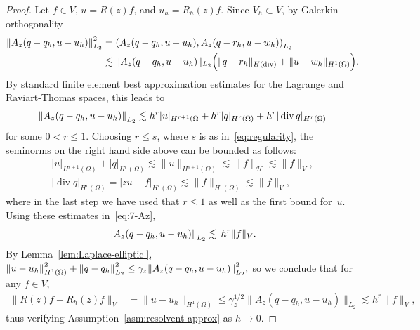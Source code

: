 \documentclass[10pt,a4paper]{amsart}
\DeclareMathOperator{\diver}{div}
\DeclarePairedDelimiter{\norm}{\lVert}{\rVert}
\newcommand{\Af}{{A}}
\newcommand{\Hc}{\mathcal{H}}
\newcommand{\om}{\Omega}
\begin{document}
\begin{proof}
  Let $f \in V$,  $u = R(z) f$,  and $u_h = R_h(z) f$.
  Since $V_h \subset V$, by Galerkin orthogonality
  \begin{align*}
    \norm*{\Af_z (q - q_h, u - u_h)}_{L_2}^2
    & =
      \left(
      \Af_z(q - q_h, u - u_h), \Af_z(q - r_h, u - w_h)
      \right)_{L_2}
    \\
    & \lesssim
      \| \Af_z(q - q_h, u - u_h)\|_{L_2}
      \Big(
      \| q - r_h \|_{H(\diver)}  + \| u - w_h \|_{H^1(\om)} 
      \Big).
  \end{align*}
  By standard finite element best approximation estimates for the Lagrange
  and Raviart-Thomas spaces, this leads to 
  \begin{equation}    
    \label{eq:7-Az}
    \norm*{\Af_z (q - q_h, u - u_h)}_{L_2}
    \lesssim h^r |u |_{H^{r+1}(\om} + h^r |q|_{H^r(\om)} + h^r | \diver q |_{H^r(\om)}
  \end{equation}
  for some $0 < r \le 1$. Choosing $r\le s$, where $s$ is as
  in~\eqref{eq:regularity}, the seminorms on the right hand side above can
  be bounded as follows:
  \begin{gather*}
    |u|_{H^{r+1}(\om)} + |q|_{H^{r}(\om)}
    \lesssim \| u \|_{H^{s+1}(\om)} \lesssim
      \| f \|_{\Hc} \lesssim \| f \|_V,
    \\
    |\diver q|_{H^{r}(\om)}
    = |z u  - f|_{H^r(\om)} \lesssim \| f \|_{H^r(\om)} \lesssim \| f \|_V,
  \end{gather*}
  where in the last step we have used that $r \le 1$ as well as the
  first bound for~$u$.  Using these estimates in~\eqref{eq:7-Az},
  \[
    \norm*{\Af_z (q - q_h, u - u_h)}_{L_2}
    \lesssim\, h^r \| f \|_V.
  \]
  By Lemma~\ref{lem:Laplace-elliptic'},
  $    \norm*{u - u_h}_{H^1(\Omega)}^2
  + \norm*{q - q_h}_{L_2}^2
  \leq
  \gamma_z \norm*{\Af_z (q - q_h, u - u_h)}_{L_2}^2,
  $
  so we conclude that for any $f \in V$, 
  \begin{align}
    \label{eq:8}
    \| R(z) f - R_h(z) f\|_V
    & = \| u - u_h \|_{H^1(\om)}
      \le \gamma_z^{1/2} \| \Af_z( q - q_h, u - u_h) \|_{L_2} 
      \lesssim h^r \| f \|_V,    
  \end{align}
  thus verifying Assumption~\ref{asm:resolvent-approx} as $h \to 0$. 
\end{proof}
\end{document}
